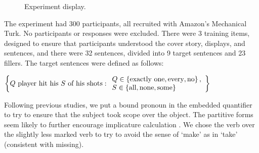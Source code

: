 \documentclass[leqno]{article}
\begin{document}
\begin{figure}[t]
  \centering
  \caption{Experiment display.}
  \label{fig:exp1}
\end{figure}

The experiment had 300 participants, all recruited with Amazon's
Mechanical Turk. No participants or responses were excluded. There
were 3 training items, designed to ensure that participants understood
the cover story, displays, and sentences, and there were 32 sentences,
divided into 9 target sentences and 23 fillers.  The target sentences
were defined as follows:
%
\begin{examples}
\item\label{expmsgs} 
    $\left\{ 
      \text{$Q$ player hit his $S$ of his shots} :
      \begin{array}{l}        
        Q \in \left\{ \text{exactly one}, \text{every}, \text{no} \right\}, \\
        S \in \left\{ \text{all}, \text{none}, \text{some} \right\}
      \end{array} \right\}$
\end{examples}
%
Following previous studies, we put a bound pronoun in the embedded
quantifier to try to ensure that the subject took scope over the
object. The partitive forms seem likely to further encourage
implicature calculation \citep{Grodner-etal:2010}. We chose the verb
 over the slightly less marked verb  to try to
avoid the sense of `make' as in `take' (consistent with missing).
\end{document}
